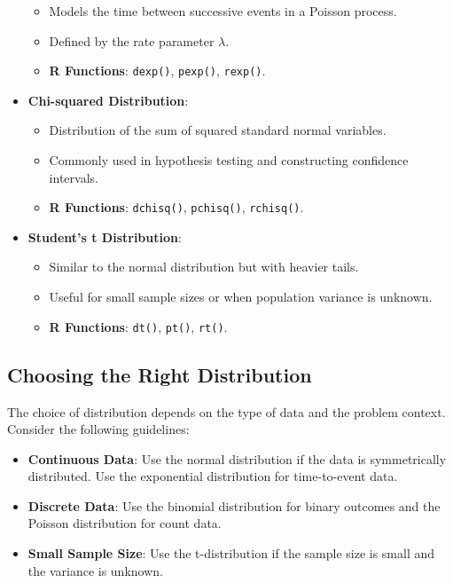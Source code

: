 \begin{itemize}
    \begin{itemize}
        \item Models the time between successive events in a Poisson process.
        \item Defined by the rate parameter \(\lambda\).
        \item \textbf{R Functions}: \texttt{dexp()}, \texttt{pexp()}, \texttt{rexp()}.
    \end{itemize}
    \item \textbf{Chi-squared Distribution}:
    \begin{itemize}
        \item Distribution of the sum of squared standard normal variables.
        \item Commonly used in hypothesis testing and constructing confidence intervals.
        \item \textbf{R Functions}: \texttt{dchisq()}, \texttt{pchisq()}, \texttt{rchisq()}.
    \end{itemize}
    \item \textbf{Student’s t Distribution}:
    \begin{itemize}
        \item Similar to the normal distribution but with heavier tails.
        \item Useful for small sample sizes or when population variance is unknown.
        \item \textbf{R Functions}: \texttt{dt()}, \texttt{pt()}, \texttt{rt()}.
    \end{itemize}
\end{itemize}

\subsection{Choosing the Right Distribution}
The choice of distribution depends on the type of data and the problem context. Consider the following guidelines:

\begin{itemize}
    \item \textbf{Continuous Data}: Use the normal distribution if the data is symmetrically distributed. Use the exponential distribution for time-to-event data.
    \item \textbf{Discrete Data}: Use the binomial distribution for binary outcomes and the Poisson distribution for count data.
    \item \textbf{Small Sample Size}: Use the t-distribution if the sample size is small and the variance is unknown.
\end{itemize}

